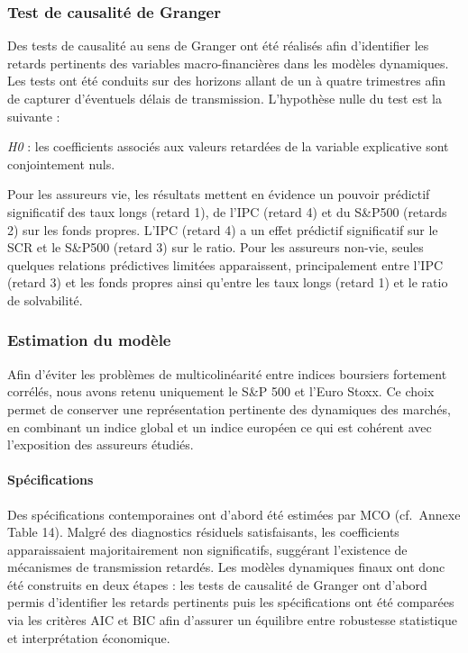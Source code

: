 \documentclass[
]{article}
\begin{document}
\subsubsection{Test de causalité de
Granger}\label{test-de-causalituxe9-de-granger}

Des tests de causalité au sens de Granger ont été réalisés afin
d'identifier les retards pertinents des variables macro-financières dans
les modèles dynamiques. Les tests ont été conduits sur des horizons
allant de un à quatre trimestres afin de capturer d'éventuels délais de
transmission. L'hypothèse nulle du test est la suivante :

\emph{H0} : les coefficients associés aux valeurs retardées de la
variable explicative sont conjointement nuls.

Pour les assureurs vie, les résultats mettent en évidence un pouvoir
prédictif significatif des taux longs (retard 1), de l'IPC (retard 4) et
du S\&P500 (retards 2) sur les fonds propres. L'IPC (retard 4) a un
effet prédictif significatif sur le SCR et le S\&P500 (retard 3) sur le
ratio. Pour les assureurs non-vie, seules quelques relations prédictives
limitées apparaissent, principalement entre l'IPC (retard 3) et les
fonds propres ainsi qu'entre les taux longs (retard 1) et le ratio de
solvabilité.

\subsubsection{Estimation du modèle}\label{estimation-du-moduxe8le}

Afin d'éviter les problèmes de multicolinéarité entre indices boursiers
fortement corrélés, nous avons retenu uniquement le S\&P 500 et l'Euro
Stoxx. Ce choix permet de conserver une représentation pertinente des
dynamiques des marchés, en combinant un indice global et un indice
européen ce qui est cohérent avec l'exposition des assureurs étudiés.

\paragraph{Spécifications}\label{spuxe9cifications}

Des spécifications contemporaines ont d'abord été estimées par MCO
(cf.~Annexe Table 14). Malgré des diagnostics résiduels satisfaisants,
les coefficients apparaissaient majoritairement non significatifs,
suggérant l'existence de mécanismes de transmission retardés. Les
modèles dynamiques finaux ont donc été construits en deux étapes : les
tests de causalité de Granger ont d'abord permis d'identifier les
retards pertinents puis les spécifications ont été comparées via les
critères AIC et BIC afin d'assurer un équilibre entre robustesse
statistique et interprétation économique.
\end{document}

